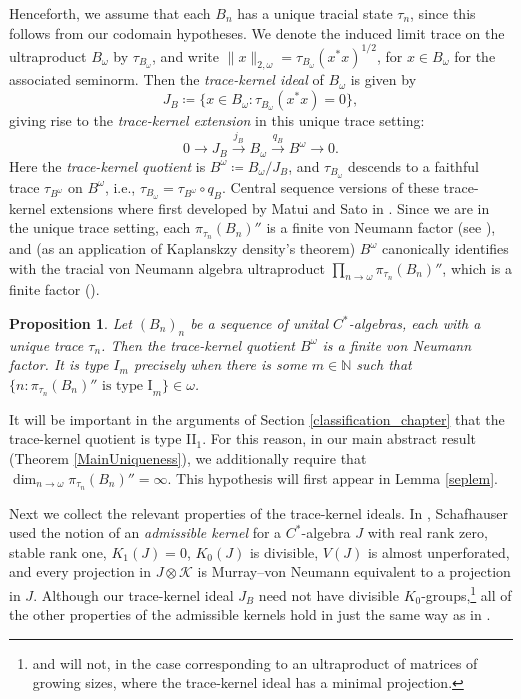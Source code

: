 \documentclass[reqno]{amsart}
\newtheorem{prop}[thm]{Proposition}
\theoremstyle{definition}
\theoremstyle{remark}
\numberwithin{equation}{section}
\theoremstyle{definition}
\begin{document}
Henceforth, we assume that each $B_n$ has a unique tracial state $\tau_n$, since this follows from our codomain hypotheses. We denote the induced limit trace on the ultraproduct $B_\omega$ by $\tau_{B_\omega}$, and write $\|x\|_{2,\omega}=\tau_{B_{\omega}}(x^*x)^{1/2}$, for $x\in B_\omega$ for the associated seminorm. Then the \emph{trace-kernel ideal} of $B_\omega$ is given by 
\begin{equation}
J_B\coloneqq \{x\in B_\omega:\tau_{B_{\omega}}(x^*x)=0\}, 
\end{equation} 
giving rise to the \emph{trace-kernel extension} in this unique trace setting: 
\begin{equation} \label{Trace_kernel}
0\longrightarrow J_B\stackrel{j_B}{\longrightarrow} B_\omega\stackrel{q_B}{\longrightarrow} B^\omega \longrightarrow 0.
\end{equation} 
Here the \emph{trace-kernel quotient} is $B^\omega\coloneqq B_\omega/J_B$, and $\tau_{B_\omega}$ descends to a faithful trace $\tau_{B^\omega}$ on $B^\omega$, i.e., $\tau_{B_{\omega}} = \tau_{B^{\omega}}\circ q_{B}$.  Central sequence versions of these trace-kernel extensions where first developed by Matui and Sato in \cite{Matui-Sato}. Since we are in the unique trace setting, each $\pi_{\tau_n}(B_n)''$ is a finite von Neumann factor (see \cite[Theorem 6.7.4]{Dixmier}), and (as an application of Kaplanskzy density's theorem) $B^\omega$ canonically identifies with the tracial von Neumann algebra ultraproduct $\prod_{n\to\omega}\pi_{\tau_n}(B_n)''$, which is a finite factor (\cite[Remark 4.7]{KR_SI}). 

\begin{prop}\label{prop:TKquotient} 
    Let $(B_n)_{n}$ be a sequence of unital $C^*$-algebras, each with a unique trace $\tau_n$. Then the trace-kernel quotient $B^\omega$ is a finite von Neumann factor. It is type $I_m$ precisely when there is some $m\in\mathbb N$ such that $\{n:\pi_{\tau_n}(B_n)''\text{ is type I}_m\}\in\omega$. 
\end{prop} 

It will be important in the arguments of Section \ref{classification_chapter} that the trace-kernel quotient is type II$_1$. For this reason, in our main abstract result (Theorem \ref{MainUniqueness}), we additionally require that $\dim_{n\to\omega}\pi_{\tau_n}(B_n)''=\infty$. This hypothesis will first appear in Lemma \ref{seplem}. 

Next we collect the relevant properties of the trace-kernel ideals. In \cite{new-TWW,Schafhauser.Annals}, Schafhauser used the notion of an \emph{admissible kernel} for a $C^*$-algebra $J$ with real rank zero, stable rank one, $K_1(J)=0$, $K_0(J)$ is divisible, $V(J)$ is almost unperforated, and every projection in $J\otimes\mathcal K$ is Murray--von Neumann equivalent to a projection in $J$. Although our trace-kernel ideal $J_{B}$ need not have divisible $K_0$-groups,\footnote{and will not, in the case corresponding to an ultraproduct of matrices of growing sizes, where the trace-kernel ideal has a minimal projection.} all of the other properties of the admissible kernels hold in just the same way as in \cite{Schafhauser.Annals}. 
\end{document}
